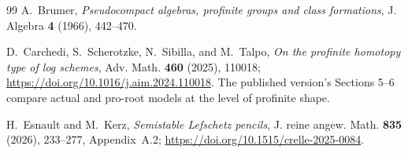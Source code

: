 \documentclass[11pt]{article}
\theoremstyle{definition}
\theoremstyle{remark}
\begin{document}
\begin{thebibliography}{99}
A.~Brumer,
\emph{Pseudocompact algebras, profinite groups and class formations},
J. Algebra \textbf{4} (1966), 442--470.

D.~Carchedi, S.~Scherotzke, N.~Sibilla, and M.~Talpo,
\emph{On the profinite homotopy type of log schemes},
Adv. Math. \textbf{460} (2025), 110018;
\url{https://doi.org/10.1016/j.aim.2024.110018}.
The published version's Sections 5--6 compare actual and pro-root
models at the level of profinite shape.

H.~Esnault and M.~Kerz,
\emph{Semistable Lefschetz pencils},
J. reine angew. Math. \textbf{835} (2026), 233--277,
Appendix~A.2;
\url{https://doi.org/10.1515/crelle-2025-0084}.

\end{thebibliography}
\end{document}
